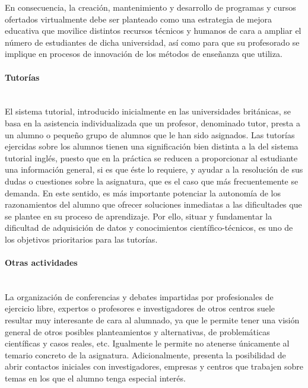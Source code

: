 En consecuencia, la creación, mantenimiento y desarrollo de programas y cursos ofertados virtualmente debe ser planteado como una estrategia de mejora educativa que movilice distintos recursos técnicos y humanos de cara a ampliar el número de estudiantes de dicha universidad, así como para que su profesorado se implique en procesos de innovación de los métodos de enseñanza que utiliza.


\paragraph{Tutorías\\\\} \label{sec:tutor}

El sistema tutorial, introducido inicialmente en las universidades británicas, se basa en la asistencia individualizada que un profesor, denominado tutor, presta a un alumno o pequeño grupo de alumnos que le han sido asignados. Las tutorías ejercidas sobre los alumnos tienen una significación bien distinta a la del sistema tutorial inglés, puesto que en la práctica se reducen a proporcionar al estudiante una información general, si es que éste lo requiere, y ayudar a la resolución de sus dudas o cuestiones sobre la asignatura, que es el caso que más frecuentemente se demanda. En este sentido, es más importante potenciar la autonomía de los razonamientos del alumno que ofrecer soluciones inmediatas a las dificultades que se plantee en su proceso de aprendizaje. Por ello, situar y fundamentar la dificultad de adquisición de datos y conocimientos científico-técnicos, es uno de los objetivos prioritarios para las tutorías.


\paragraph{Otras actividades\\\\}

La organización de conferencias y debates impartidas por profesionales de ejercicio libre, expertos o profesores e investigadores de otros centros suele resultar muy interesante de cara al alumnado, ya que le permite tener una visión general de otros posibles planteamientos y alternativas, de problemáticas científicas y casos reales, etc. Igualmente le permite no atenerse únicamente al temario concreto de la asignatura. Adicionalmente, presenta la posibilidad de abrir contactos iniciales con investigadores, empresas y centros que trabajen sobre temas en los que el alumno tenga especial interés. 

